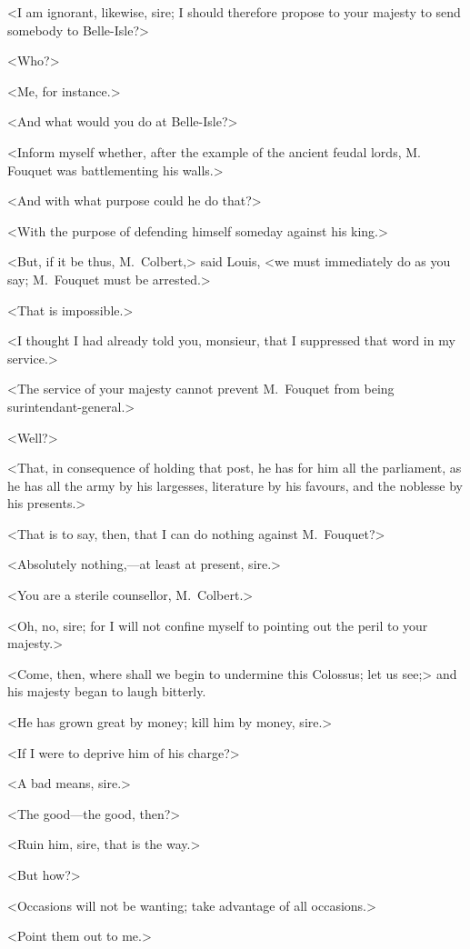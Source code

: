 <I am ignorant, likewise, sire; I should therefore propose to your majesty to send somebody to Belle-Isle?>

<Who?>

<Me, for instance.>

<And what would you do at Belle-Isle?>

<Inform myself whether, after the example of the ancient feudal lords, M.~ Fouquet was battlementing his walls.>

<And with what purpose could he do that?>

<With the purpose of defending himself someday against his king.>

<But, if it be thus, M.~Colbert,> said Louis, <we must immediately do as you say; M.~Fouquet must be arrested.>

<That is impossible.>

<I thought I had already told you, monsieur, that I suppressed that word in my service.>

<The service of your majesty cannot prevent M.~Fouquet from being surintendant-general.>

<Well?>

<That, in consequence of holding that post, he has for him all the parliament, as he has all the army by his largesses, literature by his favours, and the noblesse by his presents.>

<That is to say, then, that I can do nothing against M.~Fouquet?>

<Absolutely nothing,—at least at present, sire.>

<You are a sterile counsellor, M.~Colbert.>

<Oh, no, sire; for I will not confine myself to pointing out the peril to your majesty.>

<Come, then, where shall we begin to undermine this Colossus; let us see;> and his majesty began to laugh bitterly.

<He has grown great by money; kill him by money, sire.>

<If I were to deprive him of his charge?>

<A bad means, sire.>

<The good—the good, then?>

<Ruin him, sire, that is the way.>

<But how?>

<Occasions will not be wanting; take advantage of all occasions.>

<Point them out to me.>

